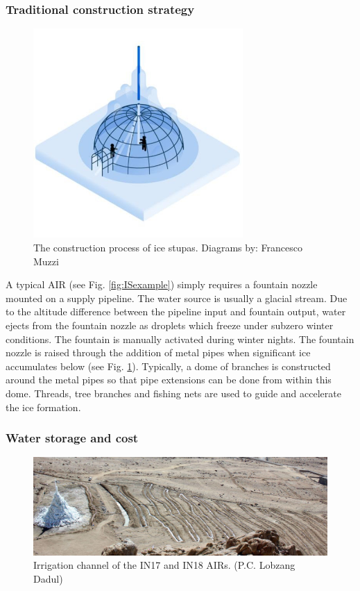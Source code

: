 \subsubsection{Traditional construction strategy}

\begin{figure}[htb]
\centering
\includegraphics[width=8cm]{figs/IS_science.jpg}
\caption{The construction process of ice stupas. Diagrams by: Francesco Muzzi }
\label{fig:ISconstruction}
\end{figure}

A typical AIR (see Fig. \ref{fig:ISexample}) simply requires a fountain nozzle mounted on a supply pipeline. The
water source is usually a glacial stream. Due to the altitude difference between the pipeline input and fountain
output, water ejects from the fountain nozzle as droplets which freeze under subzero winter conditions. The
fountain is manually activated during winter nights. The fountain nozzle is raised through the addition of metal
pipes when significant ice accumulates below (see Fig. \ref{fig:ISconstruction}).  Typically, a dome of branches
is constructed around the metal pipes so that pipe extensions can be done from within this dome. Threads, tree
branches and fishing nets are used to guide and accelerate the ice formation.

\subsubsection{Water storage and cost}

\begin{figure}[htb]
\centering
\includegraphics[width=12cm]{figs/IS_irrigation.jpeg}

\caption{Irrigation channel of the IN17 and IN18 AIRs. (P.C. Lobzang Dadul) }

\label{fig:ISirrigation}
\end{figure}

